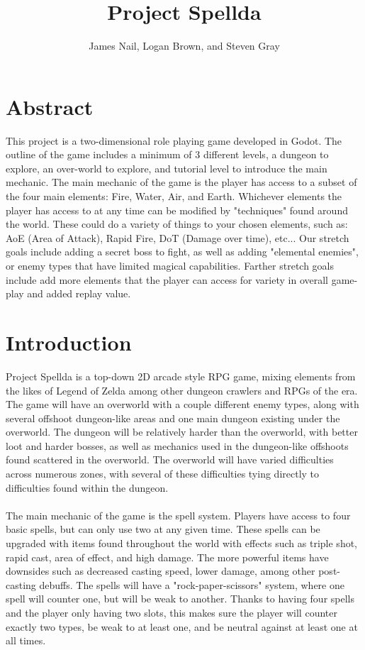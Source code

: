 \documentclass[12pt]{article}
\title{Project Spellda}
\author{James Nail, Logan Brown, and Steven Gray}
\begin{document}
	\maketitle
\newpage
	\section*{Abstract}
	This project is a two-dimensional role playing game developed in Godot. The outline of the game includes a minimum of 3 different
	levels, a dungeon to explore, an over-world to explore, and tutorial level to introduce the main mechanic. The main mechanic of 
	the game is the player has access to a subset of the four main elements: Fire, Water, Air, and Earth. Whichever elements the
	player has access to at any time can be modified by "techniques" found around the world. These could do a variety of things
	to your chosen elements, such as: AoE (Area of Attack), Rapid Fire, DoT (Damage over time), etc...
	Our stretch goals include adding a secret boss to fight, as well as adding "elemental enemies", or enemy types that
	have limited magical capabilities. Farther stretch goals include add more elements that the player can access for
	variety in overall game-play and added replay value.
\newpage
	\section*{Introduction}
	Project Spellda is a top-down 2D arcade style RPG game, mixing elements from the likes of Legend of Zelda among other dungeon crawlers
	and RPGs of the era.  The game will have an overworld with a couple different enemy types, along with several offshoot dungeon-like areas
	and one main dungeon existing under the overworld.  The dungeon will be relatively harder than the overworld, with better loot and harder
	bosses, as well as mechanics used in the dungeon-like offshoots found scattered in the overworld.  The overworld will have varied difficulties
	across numerous zones, with several of these difficulties tying directly to difficulties found within the dungeon.\\\\
	
	The main mechanic of the game is the spell system.  Players have access to four basic spells, but can only use two at any given time.  
	These spells can be upgraded with items found throughout the world with effects such as triple shot, rapid cast, area of effect, and high 
	damage.  The more powerful items have downsides such as decreased casting speed, lower damage, among other post-casting debuffs.  The spells
	will have a "rock-paper-scissors" system, where one spell will counter one, but will be weak to another.  Thanks to having four spells and
	the player only having two slots, this makes sure the player will counter exactly two types, be weak to at least one, and be neutral against
	at least one at all times.
	
\end{document}
